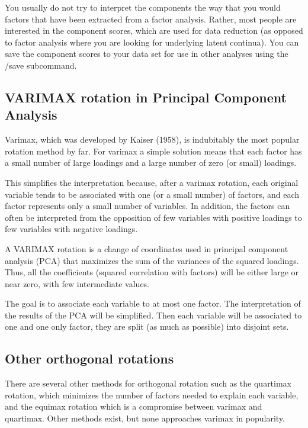  You usually do not try to interpret the components the way that you would factors that have been extracted from a factor analysis.  Rather, most people are interested in the component scores, which are used for data reduction (as opposed to factor analysis where you are looking for underlying latent continua).  You can save the component scores to your data set for use in other analyses using the /save subcommand.

\subsection{VARIMAX rotation in Principal Component Analysis}
Varimax, which was developed by Kaiser (1958), is indubitably the most
popular rotation method by far. For varimax a simple solution means that each
factor has a small number of large loadings and a large number of zero (or small)
loadings.

This simplifies the interpretation because, after a varimax rotation,
each original variable tends to be associated with one (or a small number) of
factors, and each factor represents only a small number of variables. In addition,
the factors can often be interpreted from the opposition of few variables with
positive loadings to few variables with negative loadings.


A VARIMAX rotation is a change of coordinates used in principal component analysis (PCA) that maximizes the sum of the variances of the squared loadings. Thus, all the coefficients (squared correlation with factors) will be either large or near zero, with few intermediate values.

The goal is to associate each variable to at most one factor. The interpretation of the results of the PCA will be simplified. Then each variable will be associated to one and one only factor, they are split (as much as possible) into disjoint sets.


\subsection{Other orthogonal rotations}
There are several other methods for orthogonal rotation such as the quartimax
rotation, which minimizes the number of factors needed to explain each
variable, and the equimax rotation which is a compromise between varimax
and quartimax. Other methods exist, but none approaches varimax in popularity. 